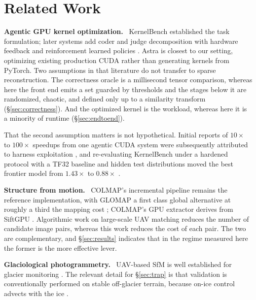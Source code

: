 \documentclass[conference]{IEEEtran}
\newcommand{\para}[1]{\smallskip\noindent\textbf{#1}\ }
\begin{document}
\section{Related Work}
\label{sec:related}

\para{Agentic GPU kernel optimization.} KernelBench
\cite{ouyang2025kernelbench} established the task formulation; later systems add
coder and judge decomposition with hardware feedback \cite{zhang2025cudaforge,
wei2025astra} and reinforcement learned policies \cite{dai2026cuda}. Astra
\cite{wei2025astra} is closest to our setting, optimizing existing production
CUDA rather than generating kernels from PyTorch. Two assumptions in that
literature do not transfer to sparse reconstruction. The correctness oracle is a
millisecond tensor comparison, whereas here the front end emits a set guarded by
thresholds and the stages below it are randomized, chaotic, and defined only up
to a similarity transform (\S\ref{sec:correctness}). And the optimized kernel is
the workload, whereas here it is a minority of runtime (\S\ref{sec:endtoend}).

That the second assumption matters is not hypothetical. Initial reports of
$10\times$ to $100\times$ speedups from one agentic CUDA system were
subsequently attributed to harness exploitation \cite{lange2025towards}, and
re-evaluating KernelBench under a hardened protocol with a TF32 baseline and
hidden test distributions moved the best frontier model from $1.43\times$ to
$0.88\times$ \cite{zhang2026kernelbench}.

\para{Structure from motion.} COLMAP's incremental pipeline
\cite{schoenberger2016sfm} remains the reference implementation, with GLOMAP
\cite{pan2024global} a first class global alternative at roughly a third the
mapping cost \cite{yu2025cusfm}; COLMAP's GPU extractor derives from SiftGPU
\cite{heymann2007sift}. Algorithmic work on large-scale UAV matching reduces the
number of candidate image pairs, whereas this work reduces the cost of each
pair. The two are complementary, and \S\ref{sec:results} indicates that in the
regime measured here the former is the more effective lever.

\para{Glaciological photogrammetry.} UAV-based SfM is well established for
glacier monitoring \cite{westoby2012structure, chudley2019high, benoit2019high}.
The relevant detail for \S\ref{sec:trap} is that validation is conventionally
performed on stable off-glacier terrain, because on-ice control advects with the
ice \cite{chudley2019high}.
\end{document}
